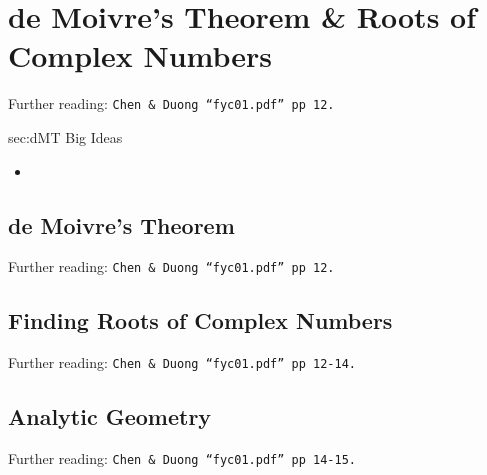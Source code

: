 \chapter{de Moivre's Theorem \& Roots of Complex Numbers}
\label{chap:dMT}
Further reading: \texttt{Chen \& Duong ``fyc01.pdf'' pp 12.}

\begin{bigideas}{sec:dMT Big Ideas}
\begin{itemize}
  \item 
\end{itemize}
\end{bigideas}

\section{de Moivre's Theorem}
\label{sec:dMT dMT}
Further reading: \texttt{Chen \& Duong ``fyc01.pdf'' pp 12.}

\section{Finding Roots of Complex Numbers}
\label{sec:dMT Finding Roots of Complex Numbers}
Further reading: \texttt{Chen \& Duong ``fyc01.pdf'' pp 12-14.}

\section{Analytic Geometry}
\label{sec:dMT Analytic Geometry}
Further reading: \texttt{Chen \& Duong ``fyc01.pdf'' pp 14-15.}